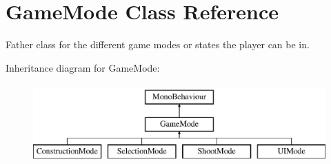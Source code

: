 \hypertarget{class_game_mode}{}\section{Game\+Mode Class Reference}
\label{class_game_mode}


Father class for the different game modes or states the player can be in.  


Inheritance diagram for Game\+Mode\+:\begin{figure}[H]
\begin{center}
\leavevmode
\includegraphics[height=3.000000cm]{class_game_mode}
\end{center}
\end{figure}
